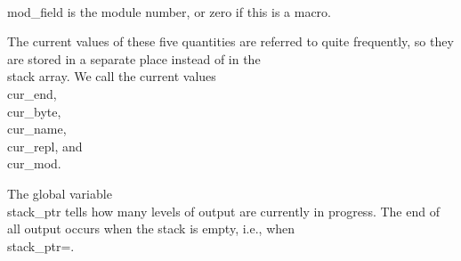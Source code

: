 \hang \\{mod\_field} is the module number, or zero if this is a macro.

\yskip\noindent The current values of these five quantities are referred to
quite frequently, so they are stored in a separate place instead of in
the \\{stack} array. We call the current values \\{cur\_end}, \\{cur\_byte},
\\{cur\_name}, \\{cur\_repl}, and \\{cur\_mod}.

The global variable \\{stack\_ptr} tells how many levels of output are
currently in progress. The end of all output occurs when the stack is
empty, i.e., when \\{stack\_ptr}\?=.

